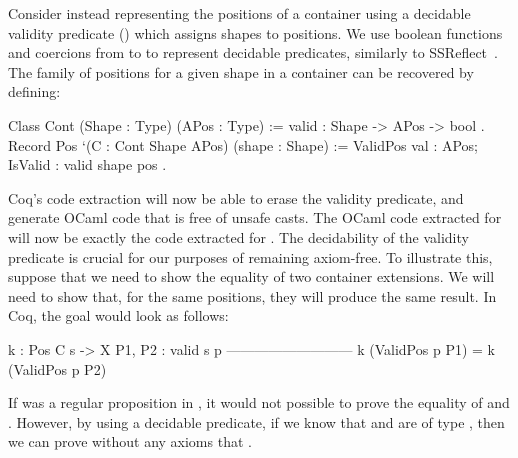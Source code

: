 \documentclass[ a4paper, UKenglish, cleveref, autoref, thm-restate]{lipics-v2021}
\begin{document}
Consider instead representing the positions of a container using a decidable
validity predicate () which assigns shapes to positions. We use
boolean functions and coercions from  to  to represent
decidable predicates, similarly to SSReflect~\cite{GonthierL09}. The family of
positions for a given shape in a container can be recovered by defining:
\begin{coqcode}
Class Cont (Shape : Type) (APos : Type) := { valid : Shape -> APos -> bool }.
Record Pos `(C : Cont Shape APos) (shape : Shape) :=
  ValidPos { val : APos; IsValid : valid shape pos }.
\end{coqcode}
Coq's code extraction will now be able to erase the validity predicate, and
generate OCaml code that is free of unsafe casts. The OCaml code extracted for
 will now be exactly the code extracted for .
The decidability of the validity predicate is crucial for our purposes of 
remaining axiom-free. To illustrate this, suppose that we need to show
the equality of two container extensions. We will need to show that, for
the same positions, they will produce the same result. In Coq, the goal
would look as follows: 
\begin{coqcode}
 k : Pos C s -> X
 P1, P2 : valid s p
 ---------------------------
 k (ValidPos p P1) = k (ValidPos p P2)
\end{coqcode}
If  was a regular proposition in , it would not possible
to prove the equality of  and . However, by using a decidable
predicate, if we know that  and  are of type 
, then we can prove without any axioms that 
.


\end{document}
